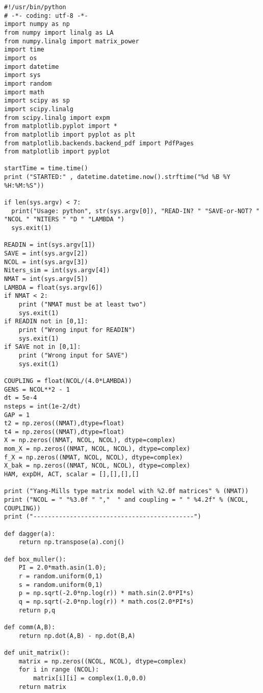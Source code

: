 \begin{lstlisting}
#!/usr/bin/python
# -*- coding: utf-8 -*-
import numpy as np
from numpy import linalg as LA
from numpy.linalg import matrix_power
import time 
import os 
import datetime 
import sys
import random
import math
import scipy as sp
import scipy.linalg
from scipy.linalg import expm
from matplotlib.pyplot import *
from matplotlib import pyplot as plt
from matplotlib.backends.backend_pdf import PdfPages
from matplotlib import pyplot

startTime = time.time()
print ("STARTED:" , datetime.datetime.now().strftime("%d %B %Y %H:%M:%S"))

if len(sys.argv) < 7:
  print("Usage: python", str(sys.argv[0]), "READ-IN? " "SAVE-or-NOT? " "NCOL " "NITERS " "D " "LAMBDA ")
  sys.exit(1)

READIN = int(sys.argv[1])
SAVE = int(sys.argv[2])
NCOL = int(sys.argv[3]) 
Niters_sim = int(sys.argv[4]) 
NMAT = int(sys.argv[5])
LAMBDA = float(sys.argv[6])
if NMAT < 2:
    print ("NMAT must be at least two")
    sys.exit(1) 
if READIN not in [0,1]:
    print ("Wrong input for READIN")
    sys.exit(1)
if SAVE not in [0,1]:
    print ("Wrong input for SAVE")
    sys.exit(1)

COUPLING = float(NCOL/(4.0*LAMBDA))
GENS = NCOL**2 - 1
dt = 5e-4
nsteps = int(1e-2/dt)
GAP = 1
t2 = np.zeros((NMAT),dtype=float)
t4 = np.zeros((NMAT),dtype=float)
X = np.zeros((NMAT, NCOL, NCOL), dtype=complex)
mom_X = np.zeros((NMAT, NCOL, NCOL), dtype=complex)
f_X = np.zeros((NMAT, NCOL, NCOL), dtype=complex)
X_bak = np.zeros((NMAT, NCOL, NCOL), dtype=complex)
HAM, expDH, ACT, scalar = [],[],[],[]

print ("Yang-Mills type matrix model with %2.0f matrices" % (NMAT)) 
print ("NCOL = " "%3.0f " ","  " and coupling = " " %4.2f" % (NCOL, COUPLING)) 
print ("--------------------------------------------")

def dagger(a):
    return np.transpose(a).conj()

def box_muller():
    PI = 2.0*math.asin(1.0);    
    r = random.uniform(0,1)
    s = random.uniform(0,1)
    p = np.sqrt(-2.0*np.log(r)) * math.sin(2.0*PI*s)
    q = np.sqrt(-2.0*np.log(r)) * math.cos(2.0*PI*s)
    return p,q

def comm(A,B):
    return np.dot(A,B) - np.dot(B,A)

def unit_matrix():
    matrix = np.zeros((NCOL, NCOL), dtype=complex)
    for i in range (NCOL):
        matrix[i][i] = complex(1.0,0.0)
    return matrix


\end{lstlisting}
